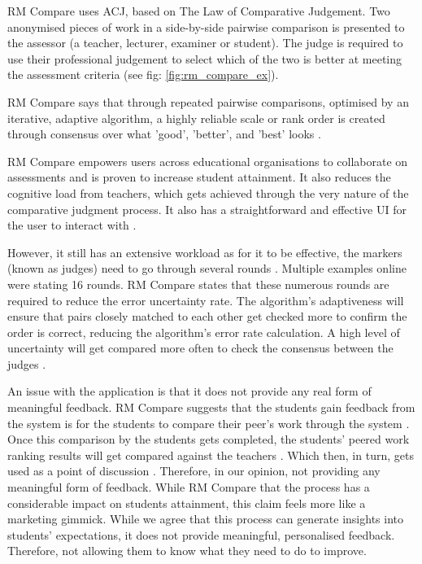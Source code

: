		RM Compare uses ACJ, based on The Law of Comparative Judgement. Two anonymised pieces of work in a side-by-side pairwise comparison is presented to the assessor (a teacher, lecturer, examiner or student). The judge is required to use their professional judgement to select which of the two is better at meeting the assessment criteria (see fig: \ref{fig:rm_compare_ex}).
		
		RM Compare says that through repeated pairwise comparisons, optimised by an iterative, adaptive algorithm, a highly reliable scale or rank order is created through consensus over what 'good', 'better', and 'best' looks \cite{rm_website}.
		
		RM Compare empowers users across educational organisations to collaborate on assessments and is proven to increase student attainment. It also reduces the cognitive load from teachers, which gets achieved through the very nature of the comparative judgment process. It also has a straightforward and effective UI for the user to interact with \cite{rm_website}.
	
		However, it still has an extensive workload as for it to be effective, the markers (known as judges) need to go through several rounds \cite{rm_website}. Multiple examples online were stating 16 rounds. RM Compare states that these numerous rounds are required to reduce the error uncertainty rate.  The algorithm's adaptiveness will ensure that pairs closely matched to each other get checked more to confirm the order is correct, reducing the algorithm's error rate calculation. A high level of uncertainty will get compared more often to check the consensus between the judges \cite{rm_website}. 
	
		An issue with the application is that it does not provide any real form of meaningful feedback. RM Compare suggests that the students gain feedback from the system is for the students to compare their peer's work through the system \cite{rm_website}. Once this comparison by the students gets completed, the students' peered work ranking results will get compared against the teachers \cite{rm_website}. Which then, in turn, gets used as a point of discussion \cite{rm_website}. Therefore, in our opinion, not providing any meaningful form of feedback. While RM Compare that the process has a considerable impact on students attainment, this claim feels more like a marketing gimmick. While we agree that this process can generate insights into students' expectations, it does not provide meaningful, personalised feedback. Therefore, not allowing them to know what they need to do to improve. %
		
